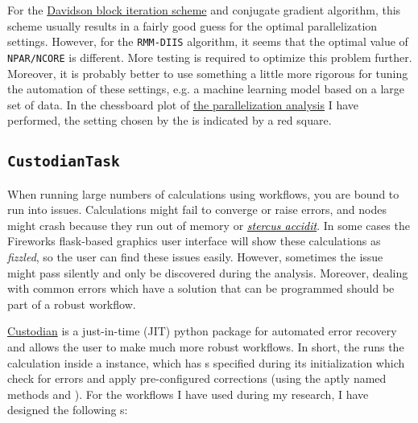 \begin{refsection}
\begin{itemize}
\end{itemize} 
 
For the \href{https://joshuagoings.com/2013/08/23/davidsons-method/}{Davidson 
block iteration scheme} and conjugate gradient algorithm, this scheme usually 
results in a fairly good guess for the optimal parallelization settings. 
However, for the \texttt{RMM-DIIS} algorithm, it seems that 
the optimal value of \texttt{NPAR/NCORE} is different. More testing is 
required to optimize this problem further. Moreover, it is probably better to 
use something a little more rigorous for tuning the automation of these 
settings, e.g. a machine learning model based on a large set of data. In 
the chessboard plot of 
\href{https://mybinder.org/v2/gh/mbercx/jupyter/master?filepath=parallel\%2Fparallel_analysis.ipynb}{the 
parallelization analysis} I have performed, the setting chosen by the 
 is indicated by a red square. 
 
\subsection{\texttt{CustodianTask}} \label{automation:sec-CustodianTask} 
 
When running large numbers of calculations using workflows, you are bound to 
run into issues. Calculations might fail to converge or raise errors, and 
nodes might crash because they run out of memory or 
\href{https://www.urbandictionary.com/define.php?term=stercus\%20accidit}{\textcolor{black}{\textit{stercus 
accidit}}}. In some cases the Fireworks flask-based graphics user interface 
will show these calculations as \textit{fizzled}, so the user can find these 
issues easily. However, sometimes the issue might pass silently and only be 
discovered during the analysis. Moreover, dealing with common errors which 
have a solution that can be programmed should be part of a robust workflow. 
 
\href{https://materialsproject.github.io/custodian/}{Custodian} is a 
just-in-time (JIT) python package for automated error recovery and allows the 
user to make much more robust workflows. In short, the  
runs the calculation inside a  instance, which has 
s specified during its initialization which check for 
errors and apply pre-configured corrections (using the aptly named methods 
 and ). For the workflows I have used during my 
research, I have designed the following s: 
 

\end{refsection}
